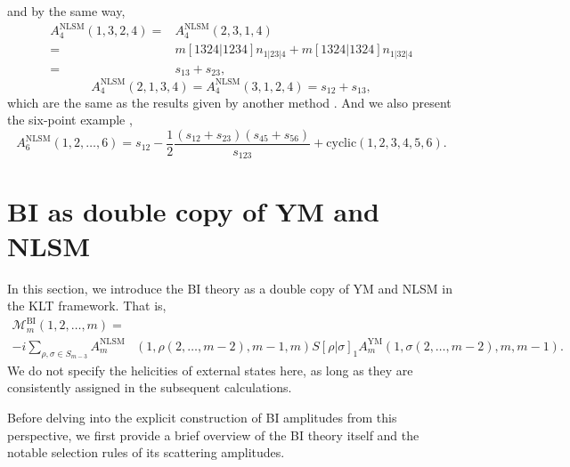 \documentclass[a4paper,11pt]{article}
\begin{document}
and by the same way,
\begin{equation}
    \begin{split}
    A_4^{\text{NLSM}}(1,3,2,4)=&A_4^{\text{NLSM}}(2,3,1,4)\\
    =&m[1324|1234]n_{1|23|4}+m[1324|1324]n_{1|32|4}\\
    =&s_{13}+s_{23},
    \end{split}
\end{equation}
\begin{equation}
    A_4^{\text{NLSM}}(2,1,3,4)=A_4^{\text{NLSM}}(3,1,2,4)=s_{12}+s_{13},
\end{equation}
which are the same as the results given by another method \cite{Carrasco:2016ldy}. 
And we also present the six-point example \cite{Carrasco:2016ldy}, 
\begin{equation}
    A_6^{\text{NLSM}}(1,2,\dots,6)=s_{12}-\frac{1}{2}\frac{(s_{12}+s_{23})(s_{45}+s_{56})}{s_{123}}+\text{cyclic}(1,2,3,4,5,6).
\end{equation}
\section{BI as double copy of YM and NLSM}
In this section, we introduce the BI theory as a double copy of YM and NLSM in the KLT framework. That is,
\begin{equation}\label{4-1}
    \begin{split}
    \mathcal{M}^{\text{BI}}_m(1,2,\dots,m)=&\\
    -i\sum_{\rho ,\sigma\in S_{m-3}}A_m^{\text{NLSM}}&(1,\rho(2,\dots,m-2),m-1,m)S[\rho|\sigma]_1 A_m^{\text{YM}}(1,\sigma(2,\dots,m-2),m,m-1).
    \end{split}
\end{equation}
We do not specify the helicities of external states here, as long as they are consistently assigned in the subsequent calculations.\par
Before delving into the explicit construction of BI amplitudes from this perspective, we first provide a brief 
overview of the BI theory itself and the notable selection rules of its scattering amplitudes.
\end{document}
